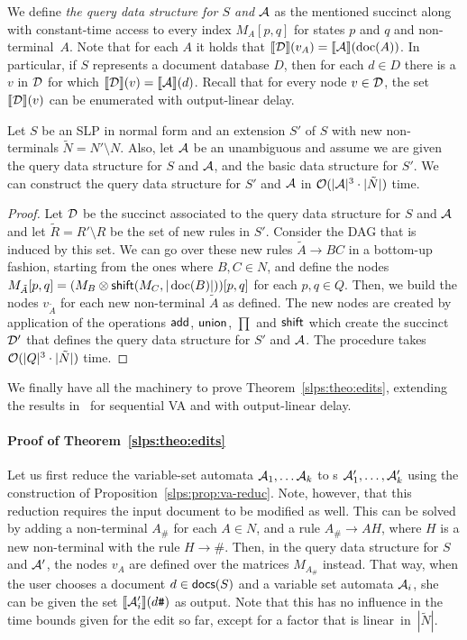 We define {\it the query data structure for $S$ and $\mathcal{A}$} as the mentioned succinct \dsabbr along with constant-time access to every index $M_A[p,q]$ for states $p$ and $q$ and non-terminal~$A$. Note that for each $A$ it holds that ${\llbracket{\mathcal{D}}\rrbracket}(v_A) = {\llbracket{\mathcal{A}}\rrbracket}(\operatorname{doc}(A))$. In particular, if $S$ represents a document database $D$, then for each $d\in D$ there is a $v$ in $\mathcal{D}$ for which ${\llbracket{\mathcal{D}}\rrbracket}(v) = {\llbracket{\mathcal{A}}\rrbracket}(d)$. Recall that for every node $v\in \mathcal{D}$, the set ${\llbracket{\mathcal{D}}\rrbracket}(v)$ can be enumerated with output-linear delay.

\begin{lemma}\label{slps:lem:ecsext}
	Let $S$ be an SLP in normal form and an extension $S'$ of $S$ with new non-terminals $\tilde{N} = N' \setminus N$. Also, let $\mathcal{A}$ be an unambiguous \crt and assume we are given the query data structure for $S$ and $\mathcal{A}$, and the basic data structure for $S'$. We can construct the query data structure for $S'$ and $\mathcal{A}$ in $\mathcal{O}(|\mathcal{A}|^3\cdot|\tilde{N}|)$ time.
\end{lemma}
\begin{proof}
	Let $\mathcal{D}$ be the succinct \dsabbr associated to the query data structure for $S$ and $\mathcal{A}$ and let $\tilde{R} = R' \setminus R$ be the set of new rules in $S'$. Consider the DAG that is induced by this set. We can go over these new rules $\tilde{A}\to BC$ in a bottom-up fashion, starting from the ones where $B,C\in N$, and define the nodes $M_{\tilde{A}}[p,q] = (M_{B}\otimes \mathsf{shift}(M_C,|\operatorname{doc}(B)|))[p,q]$ for each $p,q\in Q$. Then, we build the nodes $v_{\tilde{A}}$ for each new non-terminal $\tilde{A}$ as defined. The new nodes are created by application of the \dsabbr operations $\mathsf{add}$, $\mathsf{union}$, $\prod$ and $\mathsf{shift}$ which create the succinct \dsabbr $\mathcal{D}'$ that defines the query data structure for $S'$ and $\mathcal{A}$. The procedure takes $\mathcal{O}(|Q|^3\cdot|\tilde{N}|)$ time.
\end{proof}

We finally have all the machinery to prove Theorem~\ref{slps:theo:edits}, extending the results in~\cite{SchmidS22} for sequential VA and with output-linear delay.

\paragraph{Proof of Theorem~\ref{slps:theo:edits}} Let us first reduce the variable-set automata $\mathcal{A}_1, \ldots \mathcal{A}_k$ to \crt{}s $\mathcal{A}_1',\ldots,\mathcal{A}_k'$ using the construction of Proposition~\ref{slps:prop:va-reduc}. Note, however, that this reduction requires the input document to be modified as well. This can be solved by adding a non-terminal $A_{\texttt{\#}}$ for each $A\in N$, and a rule $A_{\texttt{\#}}\to AH$, where $H$ is a new non-terminal with the rule $H\to\texttt{\#}$. Then, in the query data structure for $S$ and $\mathcal{A}'$, the nodes $v_A$ are defined over the matrices $M_{A_{\texttt{\#}}}$ instead. That way, when the user chooses a document $d\in \textsf{docs}(S)$ and a variable set automata $\mathcal{A}_i$, she can be given the set ${\llbracket{\mathcal{A}'_i}\rrbracket}(d\texttt{\#})$ as output. Note that this has no influence in the time bounds given for the edit so far, except for a factor that is linear~in~$|\tilde{N}|$.

